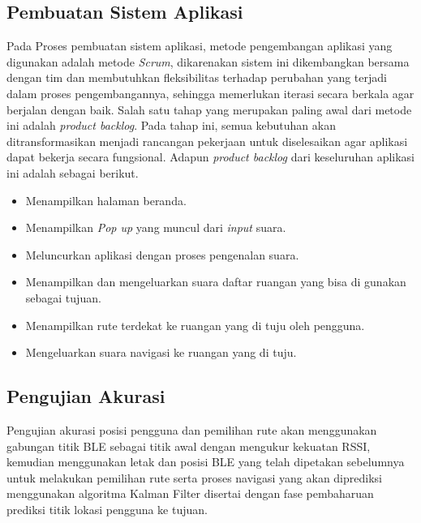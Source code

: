 \subsection{Pembuatan Sistem Aplikasi}
Pada Proses pembuatan sistem aplikasi, metode pengembangan aplikasi yang digunakan adalah metode \textit{Scrum}, dikarenakan sistem ini dikembangkan bersama dengan tim dan membutuhkan fleksibilitas terhadap perubahan yang terjadi dalam proses pengembangannya, sehingga memerlukan iterasi secara berkala agar berjalan dengan baik. Salah satu tahap yang merupakan paling awal dari metode ini adalah \textit{product backlog}. Pada tahap ini, semua kebutuhan akan ditransformasikan menjadi rancangan pekerjaan untuk diselesaikan agar aplikasi dapat bekerja secara fungsional. Adapun \textit{product backlog} dari keseluruhan aplikasi ini adalah sebagai berikut.

\begin{itemize}
\item Menampilkan halaman beranda.

\item Menampilkan \textit{Pop up} yang muncul dari \textit{input} suara.

\item Meluncurkan aplikasi dengan proses pengenalan suara.

\item Menampilkan dan mengeluarkan suara daftar ruangan yang bisa di gunakan sebagai tujuan.

\item Menampilkan rute terdekat ke ruangan yang di tuju oleh pengguna.

\item Mengeluarkan suara navigasi ke ruangan yang di tuju.

\end{itemize}

\subsection{Pengujian Akurasi}
Pengujian akurasi posisi pengguna dan pemilihan rute akan menggunakan gabungan titik BLE sebagai titik awal dengan mengukur kekuatan RSSI, kemudian menggunakan letak dan posisi BLE yang telah dipetakan sebelumnya untuk melakukan pemilihan rute serta proses navigasi yang akan diprediksi menggunakan algoritma Kalman Filter disertai dengan fase pembaharuan prediksi titik lokasi pengguna ke tujuan.

